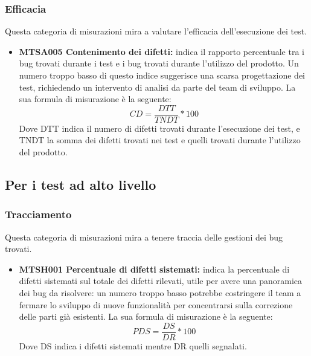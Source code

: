 \documentclass[NormeDiProgetto.tex]{subfiles}
\begin{document}
\subsubsection{Efficacia}
Questa categoria di misurazioni mira a valutare l'efficacia dell'esecuzione dei test.
\begin{itemize}
	\item \textbf{MTSA005 Contenimento dei difetti:} indica il rapporto percentuale tra i bug trovati durante i test e i bug trovati durante l'utilizzo del prodotto. Un numero troppo basso di questo indice suggerisce una scarsa progettazione dei test, richiedendo un intervento di analisi da parte del team di sviluppo. La sua formula di misurazione è la seguente:
	\[CD=\dfrac{DTT}{TNDT}*100\]
	Dove DTT indica il numero di difetti trovati durante l'esecuzione dei test, e TNDT la somma dei difetti trovati nei test e quelli trovati durante l'utilizzo del prodotto.
\end{itemize}

\subsection{Per i test ad alto livello}
\subsubsection{Tracciamento}
Questa categoria di misurazioni mira a tenere traccia delle gestioni dei bug trovati.
\begin{itemize}
	\item \textbf{MTSH001 Percentuale di difetti sistemati:} indica la percentuale di difetti sistemati sul totale dei difetti rilevati, utile per avere una panoramica dei bug da risolvere: un numero troppo basso potrebbe costringere il team a fermare lo sviluppo di nuove funzionalità per concentrarsi sulla correzione delle parti già esistenti. La sua formula di misurazione è la seguente:
	\[PDS=\dfrac{DS}{DR}*100\]
	Dove DS indica i difetti sistemati mentre DR quelli segnalati.	
\end{itemize}
\end{document}
